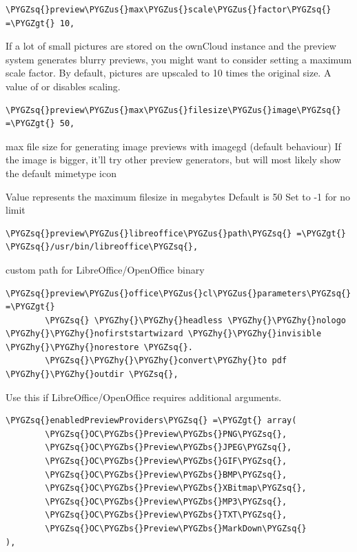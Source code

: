 \documentclass[letterpaper,10pt,english]{sphinxmanual}
\def\PYGZbs{\char`\\}
\def\PYGZus{\char`\_}
\def\PYGZgt{\char`\>}
\def\PYGZhy{\char`\-}
\def\PYGZsq{\char`\'}
\begin{document}
\begin{Verbatim}[commandchars=\\\{\}]
\PYGZsq{}preview\PYGZus{}max\PYGZus{}scale\PYGZus{}factor\PYGZsq{} =\PYGZgt{} 10,
\end{Verbatim}

If a lot of small pictures are stored on the ownCloud instance and the
preview system generates blurry previews, you might want to consider setting
a maximum scale factor. By default, pictures are upscaled to 10 times the
original size. A value of  or  disables scaling.

\begin{Verbatim}[commandchars=\\\{\}]
\PYGZsq{}preview\PYGZus{}max\PYGZus{}filesize\PYGZus{}image\PYGZsq{} =\PYGZgt{} 50,
\end{Verbatim}

max file size for generating image previews with imagegd (default behaviour)
If the image is bigger, it'll try other preview generators,
but will most likely show the default mimetype icon

Value represents the maximum filesize in megabytes
Default is 50
Set to -1 for no limit

\begin{Verbatim}[commandchars=\\\{\}]
\PYGZsq{}preview\PYGZus{}libreoffice\PYGZus{}path\PYGZsq{} =\PYGZgt{} \PYGZsq{}/usr/bin/libreoffice\PYGZsq{},
\end{Verbatim}

custom path for LibreOffice/OpenOffice binary

\begin{Verbatim}[commandchars=\\\{\}]
\PYGZsq{}preview\PYGZus{}office\PYGZus{}cl\PYGZus{}parameters\PYGZsq{} =\PYGZgt{}
        \PYGZsq{} \PYGZhy{}\PYGZhy{}headless \PYGZhy{}\PYGZhy{}nologo \PYGZhy{}\PYGZhy{}nofirststartwizard \PYGZhy{}\PYGZhy{}invisible \PYGZhy{}\PYGZhy{}norestore \PYGZsq{}.
        \PYGZsq{}\PYGZhy{}\PYGZhy{}convert\PYGZhy{}to pdf \PYGZhy{}\PYGZhy{}outdir \PYGZsq{},
\end{Verbatim}

Use this if LibreOffice/OpenOffice requires additional arguments.

\begin{Verbatim}[commandchars=\\\{\}]
\PYGZsq{}enabledPreviewProviders\PYGZsq{} =\PYGZgt{} array(
        \PYGZsq{}OC\PYGZbs{}Preview\PYGZbs{}PNG\PYGZsq{},
        \PYGZsq{}OC\PYGZbs{}Preview\PYGZbs{}JPEG\PYGZsq{},
        \PYGZsq{}OC\PYGZbs{}Preview\PYGZbs{}GIF\PYGZsq{},
        \PYGZsq{}OC\PYGZbs{}Preview\PYGZbs{}BMP\PYGZsq{},
        \PYGZsq{}OC\PYGZbs{}Preview\PYGZbs{}XBitmap\PYGZsq{},
        \PYGZsq{}OC\PYGZbs{}Preview\PYGZbs{}MP3\PYGZsq{},
        \PYGZsq{}OC\PYGZbs{}Preview\PYGZbs{}TXT\PYGZsq{},
        \PYGZsq{}OC\PYGZbs{}Preview\PYGZbs{}MarkDown\PYGZsq{}
),
\end{Verbatim}
\end{document}
